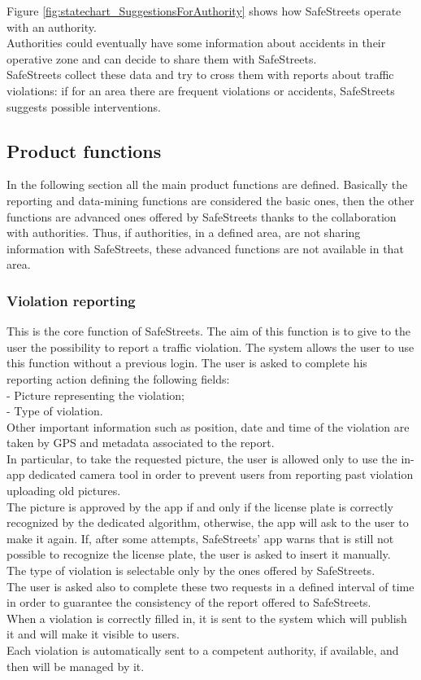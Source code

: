 \documentclass{article}
\begin{document}
	Figure \ref{fig:statechart_SuggestionsForAuthority} shows how SafeStreets operate with an authority.\\
	Authorities could eventually have some information about accidents in their operative zone and can decide to share them with SafeStreets.\\
	SafeStreets collect these data and try to cross them with reports about traffic violations: if for an area there are frequent violations or accidents, SafeStreets suggests possible interventions.
	
	\clearpage	   
	
	\subsection{Product functions}
	In the following section all the main product functions are defined. Basically the reporting and data-mining functions are considered the basic ones, then the other functions are advanced ones offered by SafeStreets thanks to the collaboration with authorities. Thus, if authorities, in a defined area, are not sharing information with SafeStreets, these advanced functions are not available in that area.
	\subsubsection{Violation reporting}
	This is the core function of SafeStreets. The aim of this function is to give to the user the possibility to report a traffic violation. The system allows the user to use this function without a previous login. The user is asked to complete his reporting action defining the following fields:\\
	- Picture representing the violation;\\
	- Type of violation.\\
	Other important information such as position, date and time of the violation are taken by GPS and metadata associated to the report.\\
	In particular, to take the requested picture, the user is allowed only to use the in-app dedicated camera tool in order to prevent users from reporting past violation uploading old pictures.\\ The picture is approved by the app if and only if the license plate is correctly recognized by the dedicated algorithm, otherwise, the app will ask to the user to make it again. If, after some attempts, SafeStreets' app warns that is still not possible to recognize the license plate, the user is asked to insert it manually. \\The type of violation is selectable only by the ones offered by SafeStreets.\\ The user is asked also to complete these two requests in a defined interval of time in order to guarantee the consistency of the report offered to SafeStreets.\\
	When a violation is correctly filled in, it is sent to the system which will publish it and will make it visible to users.\\
	Each violation is automatically sent to a competent authority, if available, and then will be managed by it.
	
\end{document}
